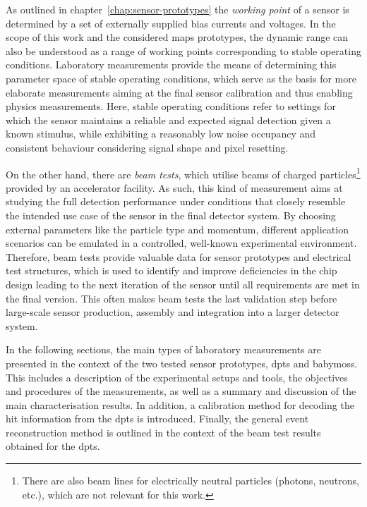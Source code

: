 As outlined in chapter~\ref{chap:sensor-prototypes} the \emph{working point} of a sensor is determined by a set of externally supplied bias currents and voltages. 
In the scope of this work and the considered \gls{maps} prototypes, the dynamic range can also be understood as a range of working points corresponding to stable operating conditions. 
Laboratory measurements provide the means of determining this parameter space of stable operating conditions, which serve as the basis for more elaborate measurements aiming at the final sensor calibration and thus enabling physics measurements. 
Here, stable operating conditions refer to settings for which the sensor maintains a reliable and expected signal detection given a known stimulus, while exhibiting a reasonably low noise occupancy and consistent behaviour considering signal shape and pixel resetting. 

On the other hand, there are \emph{beam tests}, which utilise beams of charged particles\footnote{There are also beam lines for electrically neutral particles (photons, neutrons, etc.), which are not relevant for this work.} provided by an accelerator facility. 
As such, this kind of measurement aims at studying the full detection performance under conditions that closely resemble the intended use case of the sensor in the final detector system. 
By choosing external parameters like the particle type and momentum, different application scenarios can be emulated in a controlled, well-known experimental environment. 
Therefore, beam tests provide valuable data for sensor prototypes and electrical test structures, which is used to identify and improve deficiencies in the chip design leading to the next iteration of the sensor until all requirements are met in the final version. 
This often makes beam tests the last validation step before large-scale sensor production, assembly and integration into a larger detector system. 

In the following sections, the main types of laboratory measurements are presented in the context of the two tested sensor prototypes, \gls{dpts} and \gls{babymoss}. 
This includes a description of the experimental setups and tools, the objectives and procedures of the measurements, as well as a summary and discussion of the main characterisation results. 
In addition, a calibration method for decoding the hit information from the \gls{dpts} is introduced. 
Finally, the general event reconstruction method is outlined in the context of the beam test results obtained for the \gls{dpts}.